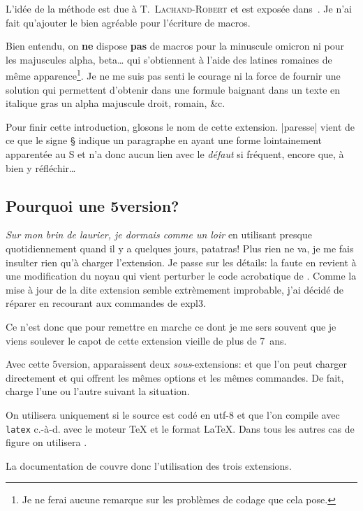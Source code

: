 \documentclass[full, french]{l3doc}
\begin{document}
L'idée de la méthode est due à T.~\textsc{Lachand-Robert} et est
exposée dans~\cite{tlachand}. Je n'ai fait qu'ajouter le
 bien agréable pour l'écriture de macros.

Bien entendu, on \textbf{ne} dispose \textbf{pas} de macros pour la
minuscule omicron ni pour les majuscules alpha, beta\dots{} qui
s'obtiennent à l'aide des latines romaines de même
apparence\footnote{Je ne ferai aucune remarque sur les problèmes de
  codage que cela pose.}. Je ne me suis pas senti le courage ni la
force de fournir une solution qui permettent d'obtenir dans une
formule baignant dans un texte en italique gras un alpha majuscule
droit, romain, \&c.

Pour finir cette introduction, glosons le nom de cette
extension. |paresse| vient de ce que le signe § indique un  \og
paragraphe \fg  en ayant une forme lointainement apparentée au
S et n'a donc aucun lien avec le \emph{défaut} si fréquent,
encore que, à bien y réfléchir\dots

\subsection{Pourquoi une 5\ieme version?}

\emph{Sur mon brin de laurier, je dormais comme un loir} en utilisant
 presque quotidiennement quand il y a quelques jours, patatras!
Plus rien ne va, je me fais insulter rien qu'à charger l'extension. Je passe sur
les détails: la faute en revient à une modification du noyau qui vient perturber
le code acrobatique de . Comme la mise à jour de la dite extension
semble extrèmement improbable, j'ai décidé de réparer  en recourant
aux commandes de expl3.

Ce n'est donc que pour remettre en marche ce dont je me sers souvent que je
viens soulever le capot de cette extension vieille de plus de 7~ans.

Avec cette 5\ieme version, apparaissent deux \emph{sous}-extensions:
 et  que l'on peut charger directement et qui
offrent les mêmes options et les mêmes commandes. De fait,  charge
l'une ou l'autre suivant la situation.

On utilisera  uniquement si le source est codé en utf-8 et que
l'on compile avec \texttt{latex} c.-à-d. avec le moteur \TeX{} et le format
\LaTeX{}. Dans tous les autres cas de figure on utilisera .

La documentation de  couvre donc l'utilisation des trois
extensions.
\end{document}
